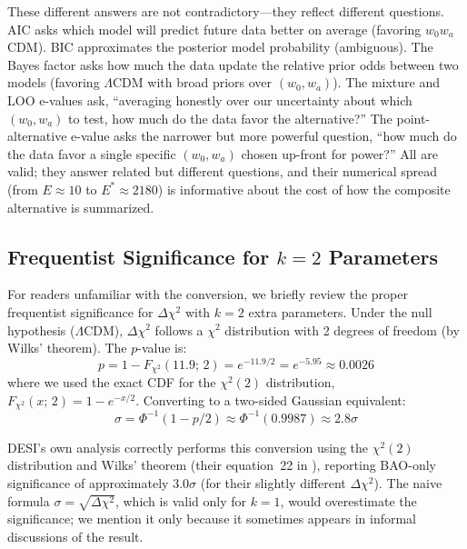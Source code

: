 \documentclass[11pt,a4paper]{article}
\newcommand{\LCDM}{$\Lambda$CDM}
\begin{document}
These different answers are not contradictory---they reflect different questions. AIC asks which model will predict future data better on average (favoring $w_0w_a$CDM). BIC approximates the posterior model probability (ambiguous). The Bayes factor asks how much the data update the relative prior odds between two models (favoring \LCDM{} with broad priors over $(w_0, w_a)$). The mixture and LOO e-values ask, ``averaging honestly over our uncertainty about which $(w_0, w_a)$ to test, how much do the data favor the alternative?'' The point-alternative e-value asks the narrower but more powerful question, ``how much do the data favor a single specific $(w_0, w_a)$ chosen up-front for power?'' All are valid; they answer related but different questions, and their numerical spread (from $E \approx 10$ to $E^{*} \approx 2180$) is informative about the cost of how the composite alternative is summarized.

\subsection{Frequentist Significance for $k = 2$ Parameters}
\label{sec:sigma}

For readers unfamiliar with the conversion, we briefly review the proper frequentist significance for $\Delta\chi^2$ with $k = 2$ extra parameters. Under the null hypothesis (\LCDM), $\Delta\chi^2$ follows a $\chi^2$ distribution with 2 degrees of freedom (by Wilks' theorem). The $p$-value is:
\begin{equation}
p = 1 - F_{\chi^2}(11.9;\, 2) = e^{-11.9/2} = e^{-5.95} \approx 0.0026
\end{equation}
where we used the exact CDF for the $\chi^2(2)$ distribution, $F_{\chi^2}(x;\, 2) = 1 - e^{-x/2}$. Converting to a two-sided Gaussian equivalent:
\begin{equation}
\sigma = \Phi^{-1}(1 - p/2) \approx \Phi^{-1}(0.9987) \approx 2.8\sigma
\end{equation}

DESI's own analysis correctly performs this conversion using the $\chi^2(2)$ distribution and Wilks' theorem (their equation~22 in \citealt{DESI2025}), reporting BAO-only significance of approximately $3.0\sigma$ (for their slightly different $\Delta\chi^2$). The naive formula $\sigma = \sqrt{\Delta\chi^2}$, which is valid only for $k = 1$, would overestimate the significance; we mention it only because it sometimes appears in informal discussions of the result.
\end{document}
